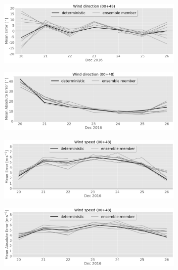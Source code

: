 \begin{figure}\ContinuedFloat
	\centering
		\begin{subfigure}[b]{0.49\textwidth}
			\includegraphics[width=\textwidth]{./fig_sfc_wd/ME_20161220_26_00}
			\caption{}\label{fig:bias:wd}
		\end{subfigure}
        \begin{subfigure}[b]{0.49\textwidth}
			\includegraphics[width=\textwidth]{./fig_sfc_wd/MAE_20161220_26_00}
			\caption{}\label{fig:MAE:wd}
		\end{subfigure}
		\begin{subfigure}[b]{0.49\textwidth}
			\includegraphics[width=\textwidth]{./fig_sfc_ws/ME_20161220_26_00}
			\caption{}\label{fig:bias:ws}
		\end{subfigure}
        \begin{subfigure}[b]{0.49\textwidth}
			\includegraphics[width=\textwidth]{./fig_sfc_ws/MAE_20161220_26_00}

\end{subfigure}
\end{figure}
